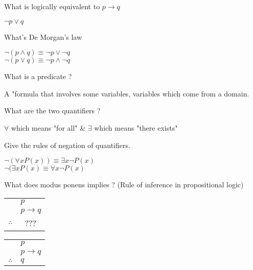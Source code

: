 \documentclass[12pt]{article}
\newcommand*{\xfield}[1]{\begin{mdframed}\centering #1\end{mdframed}\bigskip}
\newenvironment{note}{}{}
\begin{document}
\begin{note}
    \xfield{What is logically equivalent to $p \rightarrow q$}
    \xfield{$\neg p \vee q$}
\end{note}

\begin{note}
    \xfield{What's De Morgan's law}
    \xfield{
        $\neg (p\wedge q) \equiv \neg p \vee \neg q$  \\
        $\neg (p \vee q) \equiv \neg p \wedge \neg q$
    }
\end{note}

\begin{note}
    \xfield{What is a predicate ?}
    \xfield{A "formula that involves some variables, variables which come from a domain.}
\end{note}

\begin{note}
    \xfield{What are the two quantifiers ?}
    \xfield{$\forall$ which means "for all" \& $\exists$ which means "there exists"}
\end{note}

\begin{note}
    \xfield{Give the rules of negation of quantifiers.}
    \xfield{
        $\neg (\forall x P(x)) \equiv \exists x \neg P(x)$ \\
        $\neg (\exists x P(x) \equiv \forall x \neg P(x)$
    }
\end{note}

\begin{note}
    \xfield{What does modus ponens implies ? (Rule of inference in propositional logic) \begin{tabular}{c@{\,}l@{}}                          & $p$ \\& $p \to q$ \\\cline{2-2}    $\therefore$         & \ ??? \\  \end{tabular}}
    \xfield{
        \begin{tabular}{c@{\,}l@{}} 
                                 & $p$ \\
        & $p \to q$ \\\cline{2-2}
            $\therefore$         & $q$ \\  \end{tabular}
    }
\end{note}
\end{document}
